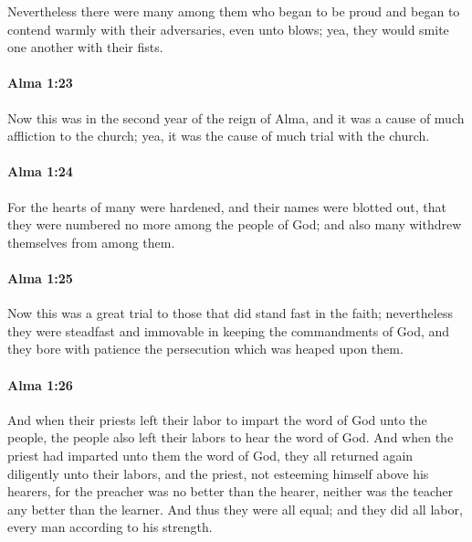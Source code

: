 			Nevertheless there were many among them who began to be proud
			and began to contend warmly with their adversaries, even unto blows;
			yea, they would smite one another with their fists.

		\paragraph{Alma 1:23} %
			\label{ALMA-1-23}

			Now this was in the second year of the reign of Alma,
			and it was a cause of much affliction to the church;
			yea, it was the cause of much trial with the church.

		\paragraph{Alma 1:24} %
			\label{ALMA-1-24}

			For the hearts of many were hardened,
			and their names were blotted out,
			that they were numbered no more among the people of God;
			and also many withdrew themselves from among them.

		\paragraph{Alma 1:25} %
			\label{ALMA-1-25}

			Now this was a great trial to those that did stand fast in the faith;
			nevertheless they were steadfast and immovable
			in keeping the commandments of God,
			and they bore with patience the persecution which was heaped upon them.

		\paragraph{Alma 1:26} %
			\label{ALMA-1-26}

			And when their priests left their labor
			to impart the word of God unto the people,
			the people also left their labors to hear the word of God.
			And when the priest had imparted unto them the word of God,
			they all returned again diligently unto their labors, and the priest,
			not esteeming himself above his hearers,
			for the preacher was no better than the hearer,
			neither was the teacher any better than the learner.
			And thus they were all equal;
			and they did all labor, every man according to his strength.

